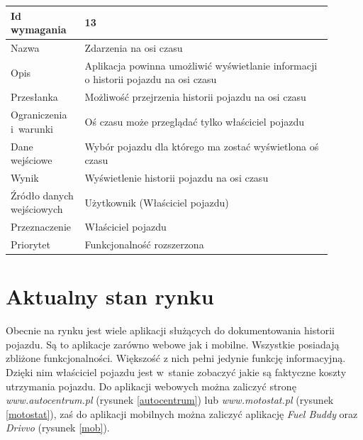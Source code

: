 \documentclass[12pt]{article}
\begin{document}
\begin{table}[H]
\begin{center}
	\begin{tabular}{|p{0.18\linewidth}|p{0.72\linewidth}|}%
	\hline
	Id wymagania 	& 13 				\\ \hline
	Nazwa			& Zdarzenia na osi czasu \\ \hline
	Opis &Aplikacja powinna umożliwić wyświetlanie informacji o historii pojazdu na osi czasu
\\ \hline
	Przesłanka & Możliwość przejrzenia historii pojazdu na osi czasu \\ \hline
	Ograniczenia i~warunki & Oś czasu może przeglądać tylko właściciel pojazdu \\ \hline
	Dane wejściowe & Wybór pojazdu dla którego ma zostać wyświetlona oś czasu \\ \hline
	Wynik &Wyświetlenie historii pojazdu na osi czasu\\ \hline
	Źródło danych wejściowych &Użytkownik (Właściciel pojazdu)\\ \hline
	Przeznaczenie & Właściciel pojazdu\\ \hline
	Priorytet & Funkcjonalność rozszerzona \\ \hline
	\end{tabular}
\end{center}
\end{table}
\newpage
\section{Aktualny stan rynku }
	
Obecnie na rynku jest wiele aplikacji służących do dokumentowania historii pojazdu. Są to aplikacje zarówno webowe jak i mobilne. Wszystkie posiadają zbliżone funkcjonalności. Większość z nich pełni jedynie funkcję informacyjną. Dzięki nim właściciel pojazdu jest w~stanie zobaczyć jakie są faktyczne koszty utrzymania pojazdu. Do aplikacji webowych można zaliczyć stronę \textit{www.autocentrum.pl} (rysunek \ref{autocentrum}) lub \textit{www.motostat.pl} (rysunek \ref{motostat}), zaś do aplikacji mobilnych można zaliczyć aplikację \textit{Fuel Buddy} oraz \textit{Drivvo} (rysunek \ref{mob}). \\
\end{document}
